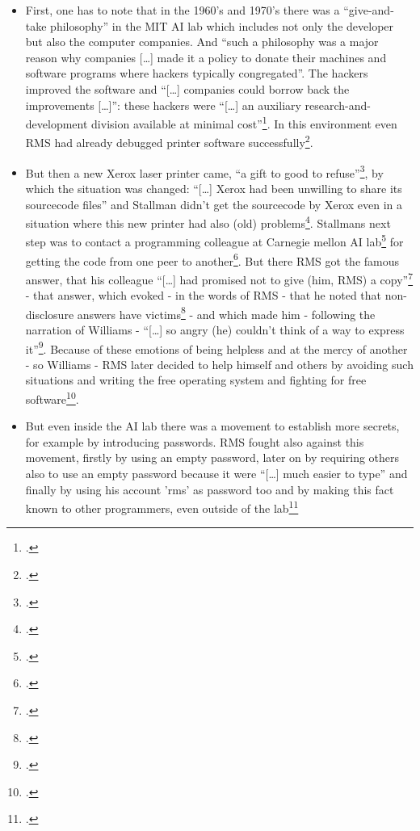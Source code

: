 \documentclass[DIV=calc,BCOR=5mm,11pt,headings=small,oneside,abstract=true, toc=bib]{scrartcl}
\begin{document}
\begin{itemize}
  \item First, one has to note that in the 1960's and 1970's there was a
  \enquote{give-and-take philosophy} in the MIT AI lab which includes not
  only the developer but also the computer companies. And \enquote{such a
  philosophy was a major reason why companies [\ldots] made it a policy
  to donate their machines and software programs where hackers typically
  congregated}. The hackers improved the software and \enquote{[\ldots]
  companies could borrow back the improvements [\ldots]}: these hackers
  were \enquote{[\ldots] an auxiliary research-and-development division
  available at minimal cost}\footcite[cf][4]{Williams2002a}. In this
  environment even RMS had already debugged printer software
  successfully\footcite[cf][3 and 5]{Williams2002a}.
  \item But then a new Xerox laser printer came, \enquote{a gift to good to
  refuse}\footcite[cf][2]{Williams2002a}, by which the situation was
  changed: \enquote{[\ldots] Xerox had been unwilling to share its
  sourcecode files} and Stallman didn't get the sourcecode by Xerox even
  in a situation where this new printer had also (old)
  problems\footcite[cf][6]{Williams2002a}. Stallmans next step was to contact a
  programming colleague at Carnegie mellon AI lab\footcite[cf][7]{Williams2002a}
  for getting the code from one peer to another\footcite[cf][8]{Williams2002a}.
  But there RMS got the famous answer, that his colleague \enquote{[\ldots]
  had promised not to give (him, RMS) a
  copy}\footcite[cf][8]{Williams2002a} - that answer, which evoked - in
  the words of RMS - that he noted that non-disclosure answers have
  victims\footcite[cf][158]{Stallman2001a} - and which made him - following the
  narration of Williams - \enquote{[\ldots] so angry (he) couldn't think of a way
  to express it}\footcite[cf][9]{Williams2002a}. Because of these emotions
  of being helpless and at the mercy of another - so Williams - RMS later
  decided to help himself and others by avoiding such situations and writing the
  free operating system and fighting for free
  software\footcite[cf][11f]{Williams2002a}.
  \item But even inside the AI lab there was a movement to establish more
  secrets, for example by introducing passwords. RMS fought also against this
  movement, firstly by using an empty password, later on by requiring others
  also to use an empty password because it were \enquote{[\ldots] much easier to
  type} and finally by using his account 'rms' as password too and by
  making this fact known to other programmers, even outside of the
  lab\footcite[cf][53ff, 93f et passim]{Williams2002a}
\end{itemize}
\end{document}
